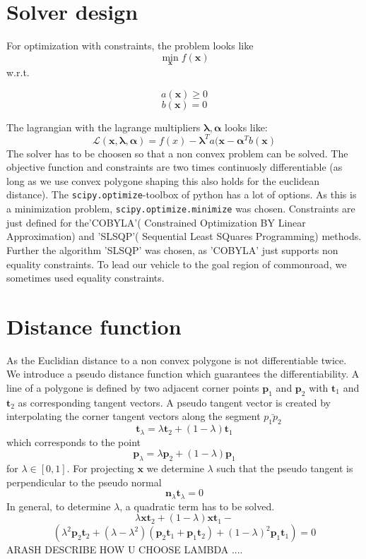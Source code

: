 \documentclass[conference]{IEEEtran}
\begin{document}
\section{Solver design}
For optimization with constraints, the problem looks like 
\begin{equation}
\min_{\mathbf{x}} f(\mathbf{x})
\end{equation}
w.r.t.

$$a(\mathbf{x}) \geq 0$$
$$b(\mathbf{x}) = 0$$

The lagrangian with the lagrange multipliers $\mathbf{\lambda},\mathbf{\alpha}$ looks like:
\begin{equation}
\mathcal{L}(\mathbf{x},\mathbf{\lambda},\mathbf{\alpha}) = f(x) - \mathbf{\lambda}^T a(\mathbf{x} -\mathbf{\alpha}^T b (\mathbf{x})
\end{equation}
The solver has to be choosen so that a non convex problem can be solved. The objective function and constraints are two times continuosly differentiable (as long as we use convex polygone shaping this also holds for the euclidean distance). The \texttt{scipy.optimize}-toolbox of python has a lot of options.
 As this is a minimization problem, \texttt{scipy.optimize.minimize} was chosen. Constraints are just defined for the'COBYLA'( Constrained Optimization BY Linear Approximation) and 'SLSQP'( Sequential Least SQuares Programming) methods. Further the algorithm 'SLSQP' was chosen, as 'COBYLA' just supports non equality constraints. To lead our vehicle to the goal region of commonroad, we sometimes used equality constraints.
\section{Distance function}
As the Euclidian distance to a non convex polygone is not differentiable twice. We introduce a pseudo distance function which guarantees the differentiability. A line of a polygone is defined by two adjacent corner points $\mathbf{p}_1$ and $\mathbf{p}_2$ with $\mathbf{t}_1$  and $\mathbf{t}_2$ as corresponding tangent vectors.
A pseudo tangent vector is created by interpolating the corner tangent vectors along the segment $\bar{p_1p_2}$ 
$$
\mathbf{t}_\lambda = \lambda \mathbf{t}_2 + (1-\lambda) \mathbf{t}_1
$$
which corresponds to the point 
$$
\mathbf{p}_\lambda = \lambda \mathbf{p}_2 + (1-\lambda) \mathbf{p}_1
$$
for $\lambda \in [0,1]$. For projecting $\mathbf{x}$ we determine $\lambda$ such that the pseudo tangent is perpendicular to the pseudo normal 
$$
\mathbf{n}_\lambda \mathbf{t}_\lambda = 0
$$
In general, to determine $\lambda$, a quadratic term has to be solved.
$$
\lambda \mathbf{x} \mathbf{t}_2 + (1-\lambda) \mathbf{x}\mathbf{t}_1 - $$ $$(\lambda^2\mathbf{p}_2 \mathbf{t}_2 +(\lambda-\lambda^2)(\mathbf{p}_2 \mathbf{t}_1 +\mathbf{p}_1 \mathbf{t}_2) +(1- \lambda)^2 \mathbf{p}_1 \mathbf{t}_1) = 0
$$
ARASH DESCRIBE HOW U CHOOSE LAMBDA ....
\end{document}

